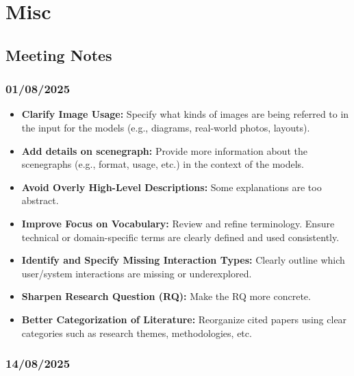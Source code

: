 \documentclass{article}
\begin{document}
\section{Misc}

\subsection{Meeting Notes}

\subsubsection{01/08/2025}    

\begin{itemize}
    \item \textbf{Clarify Image Usage:} Specify what kinds of images are being referred to in the input for the models (e.g., diagrams, real-world photos, layouts).
    
    \item \textbf{Add details on scenegraph:} Provide more information about the scenegraphs (e.g., format, usage, etc.) in the context of the models.
    
    \item \textbf{Avoid Overly High-Level Descriptions:} Some explanations are too abstract.
    
    \item \textbf{Improve Focus on Vocabulary:} Review and refine terminology. Ensure technical or domain-specific terms are clearly defined and used consistently.
    
    \item \textbf{Identify and Specify Missing Interaction Types:} Clearly outline which user/system interactions are missing or underexplored.
    
    \item \textbf{Sharpen Research Question (RQ):} Make the RQ more concrete.
    
    \item \textbf{Better Categorization of Literature:} Reorganize cited papers using clear categories such as research themes, methodologies, etc.
\end{itemize}

\subsubsection{14/08/2025}    
\end{document}
